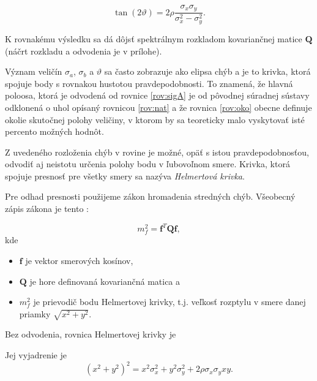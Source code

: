 \begin{equation}\label{rov:nat}
\tan{\left(2\vartheta\right)} = 2\rho\dfrac{\sigma_{x}\sigma_{y}}{\sigma_{x}^2 - \sigma_{y}^2}.
\end{equation}

K rovnakému výsledku sa dá dôjsť spektrálnym rozkladom kovariančnej matice $\mathbf{Q}$ (náčrt rozkladu a odvodenia je v prílohe).

Význam veličín $\sigma_a$, $\sigma_b$ a $\vartheta$ sa často zobrazuje ako elipsa chýb a je to krivka, ktorá spojuje body s rovnakou hustotou pravdepodobnosti. To znamená, že hlavná poloosa, ktorá je odvodená od rovnice \ref{rov:sigA} je od pôvodnej súradnej sústavy odklonená o uhol opísaný rovnicou \ref{rov:nat} a že rovnica \ref{rov:oko} obecne definuje okolie skutočnej polohy veličiny, v ktorom by sa teoreticky malo vyskytovať isté percento možných hodnôt.

Z uvedeného rozloženia chýb v rovine je možné, opäť s istou pravdepodobnosťou, odvodiť aj neistotu určenia polohy bodu v ľubovoľnom smere. Krivka, ktorá spojuje presnosť pre všetky smery sa nazýva \textit{Helmertová krivka}.

Pre odhad presnosti použijeme zákon hromadenia stredných chýb. Všeobecný zápis zákona je tento \cite{Hampacher2003}:

\begin{equation}
m_f^2 = \mathbf{f}^T\mathbf{Q}\mathbf{f},
\end{equation}
kde
\begin{itemize}
\item $\mathbf{f}$ je vektor smerových kosínov,
\item $\mathbf{Q}$ je hore definovaná kovariančná matica a
\item $m_f^2$ je prievodič bodu Helmertovej krivky, t.j. veľkosť rozptylu v smere danej priamky $\sqrt{x^2+y^2}$.
\end{itemize}

Bez odvodenia, rovnica Helmertovej krivky je %


Jej vyjadrenie je
\begin{equation}
 \left( x^2 + y^2\right)^2 = x^2\sigma_x^2 + y^2\sigma_y^2 + 2\rho \sigma_x \sigma_y xy.
\end{equation}

